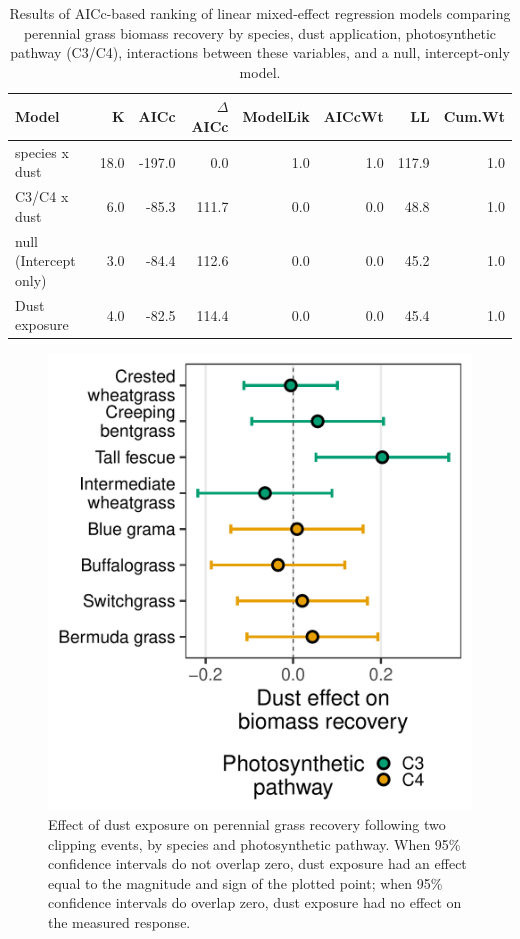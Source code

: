 \documentclass{svjour3}
\begin{document}
\begin{table}[ht]
	\centering
	\begin{tabular}{lrrrrrrr}
		\hline
		Model & K & AICc & $\Delta$AICc & ModelLik & AICcWt & LL & Cum.Wt \\ 
		\hline
		species x dust & 18.0 & -197.0 & 0.0 & 1.0 & 1.0 & 117.9 & 1.0 \\ 
		C3/C4 x dust & 6.0 & -85.3 & 111.7 & 0.0 & 0.0 & 48.8 & 1.0 \\ 
		null (Intercept only) & 3.0 & -84.4 & 112.6 & 0.0 & 0.0 & 45.2 & 1.0 \\ 
		Dust exposure & 4.0 & -82.5 & 114.4 & 0.0 & 0.0 & 45.4 & 1.0 \\ 
		\hline
	\end{tabular}
	\caption{Results of AICc-based ranking of linear mixed-effect regression models comparing perennial grass biomass recovery by species, dust application, photosynthetic pathway (C3/C4), interactions between these variables, and a null, intercept-only model.} 
	\label{tab:grassAIC}
\end{table}

\begin{figure}
	\centering
	\includegraphics[width=0.6\linewidth]{GrassCIs-1}
	\caption{Effect of dust exposure on perennial grass recovery following two clipping events, by species and photosynthetic pathway. 
		When 95\% confidence intervals do not overlap zero, dust exposure had an effect equal to the magnitude and sign of the plotted point; when 95\% confidence intervals do overlap zero, dust exposure had no effect on the measured response. \label{fig:grassCIs} }
\end{figure}


\clearpage 
\end{document}
